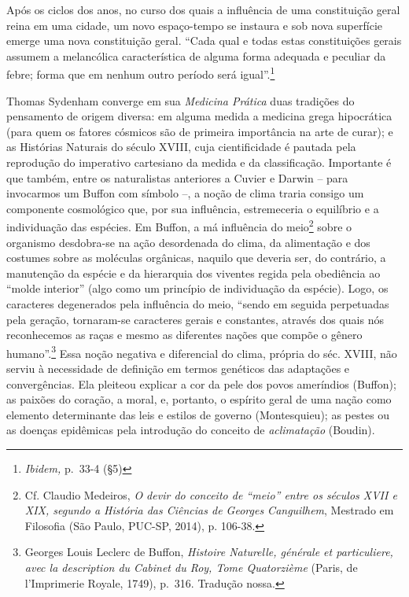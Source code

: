 Após os ciclos dos anos, no curso dos quais a influência de uma
constituição geral reina em uma cidade, um novo espaço-tempo se instaura
e sob nova superfície emerge uma nova constituição geral. ``Cada qual e
todas estas constituições gerais assumem a melancólica característica de
alguma forma adequada e peculiar da febre; forma que em nenhum outro
período será igual''.\footnote{\emph{Ibidem,} p.~33-4 (§5)}

Thomas Sydenham converge em sua \emph{Medicina Prática} duas tradições
do pensamento de origem diversa: em alguma medida a medicina grega
hipocrática (para quem os fatores cósmicos são de primeira importância
na arte de curar); e as Histórias Naturais do século XVIII, cuja
cientificidade é pautada pela reprodução do imperativo cartesiano da
medida e da classificação. Importante é que também, entre os
naturalistas anteriores a Cuvier e Darwin -- para invocarmos um Buffon
com símbolo --, a noção de clima traria consigo um componente
cosmológico que, por sua influência, estremeceria o equilíbrio e a
individuação das espécies. Em Buffon, a má influência do meio\footnote{Cf.
  Claudio Medeiros, \emph{O devir do conceito de ``meio'' entre os
  séculos XVII e XIX, segundo a História das Ciências de Georges
  Canguilhem}, Mestrado em Filosofia (São Paulo, PUC-SP, 2014), p.
  106-38.} sobre o organismo desdobra-se na ação desordenada do clima,
da alimentação e dos costumes sobre as moléculas orgânicas, naquilo que
deveria ser, do contrário, a manutenção da espécie e da hierarquia dos
viventes regida pela obediência ao ``molde interior'' (algo como um
princípio de individuação da espécie). Logo, os caracteres degenerados
pela influência do meio, ``sendo em seguida perpetuadas pela geração,
tornaram-se caracteres gerais e constantes, através dos quais nós
reconhecemos as raças e mesmo as diferentes nações que compõe o gênero
humano''.\footnote{Georges Louis Leclerc de Buffon, \emph{Histoire
  Naturelle, générale et particuliere, avec la description du Cabinet du
  Roy, Tome Quatorzième} (Paris, de l'Imprimerie Royale, 1749), p.~316.
  Tradução nossa.} Essa noção negativa e diferencial do clima, própria
do séc. XVIII, não serviu à necessidade de definição em termos genéticos
das adaptações e convergências. Ela pleiteou explicar a cor da pele dos
povos ameríndios (Buffon); as paixões do coração, a moral, e, portanto,
o espírito geral de uma nação como elemento determinante das leis e
estilos de governo (Montesquieu); as pestes ou as doenças epidêmicas
pela introdução do conceito de \emph{aclimatação} (Boudin).

